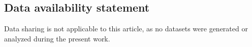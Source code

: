 \documentclass[a4paper, 11pt]{article}
\theoremstyle{plain}
\newcommand{\?}{\textcolor{red}{??}}
\newcommand{\Z}{\mathbb{Z}}
\begin{document}

 
\subsection*{Data availability statement} 
Data sharing is not applicable to this article, as no datasets were generated or analyzed during the present work.
\end{document}
